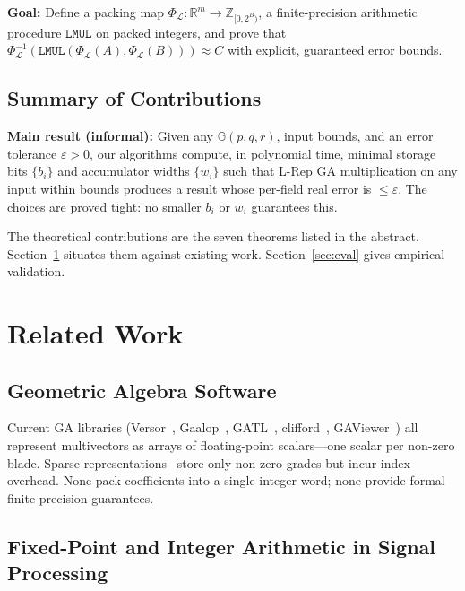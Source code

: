 \documentclass[11pt,a4paper]{article}
\theoremstyle{definition}
\theoremstyle{plain}
\theoremstyle{remark}
\newcommand{\GA}{\mathbb{G}}
\newcommand{\Pack}{\Phi_{\mathcal{L}}}
\newcommand{\Unpack}{\Phi^{-1}_{\mathcal{L}}}
\begin{document}
\textbf{Goal:} Define a packing map $\Pack: \mathbb{R}^m \to \mathbb{Z}_{[0,2^B)}$, a finite-precision arithmetic procedure $\mathtt{LMUL}$ on packed integers, and prove that $\Unpack(\mathtt{LMUL}(\Pack(A), \Pack(B))) \approx C$ with explicit, guaranteed error bounds.

\subsection{Summary of Contributions}

\begin{keyresult}
\textbf{Main result (informal):} Given any $\GA(p,q,r)$, input bounds, and an error tolerance $\varepsilon > 0$, our algorithms compute, in polynomial time, minimal storage bits $\{b_i\}$ and accumulator widths $\{w_i\}$ such that L-Rep GA multiplication on any input within bounds produces a result whose per-field real error is $\le \varepsilon$.  The choices are proved tight: no smaller $b_i$ or $w_i$ guarantees this.
\end{keyresult}

The theoretical contributions are the seven theorems listed in the abstract.  Section~\ref{sec:related} situates them against existing work.  Section~\ref{sec:eval} gives empirical validation.

\section{Related Work}
\label{sec:related}

\subsection{Geometric Algebra Software}

Current GA libraries (Versor~\cite{versor}, Gaalop~\cite{gaalop}, GATL~\cite{gatl}, clifford~\cite{clifford}, GAViewer~\cite{gaviewer}) all represent multivectors as arrays of floating-point scalars---one scalar per non-zero blade.  Sparse representations~\cite{fontijne2007} store only non-zero grades but incur index overhead.  None pack coefficients into a single integer word; none provide formal finite-precision guarantees.

\subsection{Fixed-Point and Integer Arithmetic in Signal Processing}
\end{document}
